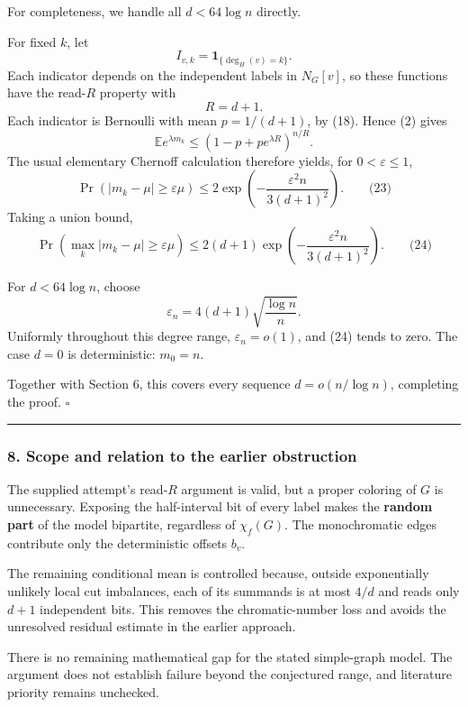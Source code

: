 \documentclass[
  11pt,
  a4paper,
]{article}
\begin{document}
For completeness, we handle all \(d<64\log n\) directly.

For fixed \(k\), let \[
I_{v,k}=\mathbf 1_{\{\deg_H(v)=k\}}.
\] Each indicator depends on the independent labels in \(N_G[v]\), so
these functions have the read-\(R\) property with \[
R=d+1.
\] Each indicator is Bernoulli with mean \(p=1/(d+1)\), by (18). Hence
(2) gives \[
\mathbb E e^{\lambda m_k}
\le
\left(1-p+p e^{\lambda R}\right)^{n/R}.
\] The usual elementary Chernoff calculation therefore yields, for
\(0<\varepsilon\le1\), \[
\Pr(|m_k-\mu|\ge\varepsilon\mu)
\le
2\exp\left(
-\frac{\varepsilon^2 n}{3(d+1)^2}
\right).
\qquad\text{(23)}
\] Taking a union bound, \[
\Pr\left(
\max_k|m_k-\mu|\ge\varepsilon\mu
\right)
\le
2(d+1)\exp\left(
-\frac{\varepsilon^2 n}{3(d+1)^2}
\right).
\qquad\text{(24)}
\]

For \(d<64\log n\), choose \[
\varepsilon_n=4(d+1)\sqrt{\frac{\log n}{n}}.
\] Uniformly throughout this degree range, \(\varepsilon_n=o(1)\), and
(24) tends to zero. The case \(d=0\) is deterministic: \(m_0=n\).

Together with Section 6, this covers every sequence \(d=o(n/\log n)\),
completing the proof. \(\square\)

\begin{center}\rule{0.5\linewidth}{0.5pt}\end{center}

\subsubsection{8. Scope and relation to the earlier
obstruction}\label{scope-and-relation-to-the-earlier-obstruction}

The supplied attempt's read-\(R\) argument is valid, but a proper
coloring of \(G\) is unnecessary. Exposing the half-interval bit of
every label makes the \textbf{random part} of the model bipartite,
regardless of \(\chi_f(G)\). The monochromatic edges contribute only the
deterministic offsets \(b_v\).

The remaining conditional mean is controlled because, outside
exponentially unlikely local cut imbalances, each of its summands is at
most \(4/d\) and reads only \(d+1\) independent bits. This removes the
chromatic-number loss and avoids the unresolved residual estimate in the
earlier approach.

There is no remaining mathematical gap for the stated simple-graph
model. The argument does not establish failure beyond the conjectured
range, and literature priority remains unchecked.
\end{document}
